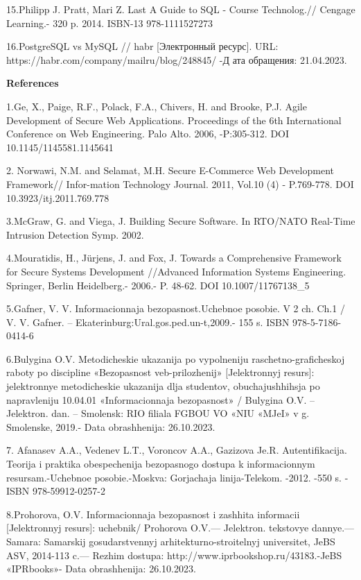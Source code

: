 15.Philipp J. Pratt, Mari Z. Last A Guide to SQL - Course Technolog.//
Cengage Learning.- 320 p. 2014. ISBN-13 978-1111527273

16.PostgreSQL vs MySQL // habr {[}Электронный ресурс{]}. URL:
https://habr.com/company/mailru/blog/248845/ -Д ата обращения:
21.04.2023.

{\bfseries References}

1.Ge, X., Paige, R.F., Polack, F.A., Chivers, H. and Brooke, P.J. Agile
Development of Secure Web Applications. Proceedings of the 6th
International Conference on Web Engineering. Palo Alto. 2006,
-P:305-312. DOI 10.1145/1145581.1145641

2. Norwawi, N.M. and Selamat, M.H. Secure E-Commerce Web Development
Framework// Infor-mation Technology Journal. 2011, Vol.10 (4) -
P.769-778. DOI 10.3923/itj.2011.769.778

3.McGraw, G. and Viega, J. Building Secure Software. In RTO/NATO
Real-Time Intrusion Detection Symp. 2002.

4.Mouratidis, H., Jürjens, J. and Fox, J. Towards a Comprehensive
Framework for Secure Systems Development //Advanced Information Systems
Engineering. Springer, Berlin Heidelberg.- 2006.- P. 48-62. DOI
10.1007/11767138\_5

5.Gafner, V. V. Informacionnaja bezopasnost\textquotesingle.Uchebnoe
posobie. V 2 ch. Ch.1 / V. V. Gafner. --
Ekaterinburg:Ural.gos.ped.un-t,2009.- 155 s. ISBN 978-5-7186-0414-6

6.Bulygina O.V. Metodicheskie ukazanija po vypolneniju
raschetno-graficheskoj raboty po discipline
«Bezopasnost\textquotesingle{} veb-prilozhenij» {[}Jelektronnyj
resurs{]}: jelektronnye metodicheskie ukazanija dlja studentov,
obuchajushhihsja po napravleniju 10.04.01 «Informacionnaja
bezopasnost\textquotesingle» / Bulygina O.V. -- Jelektron. dan. --
Smolensk: RIO filiala FGBOU VO «NIU «MJeI» v g. Smolenske, 2019.- Data
obrashhenija: 26.10.2023.

7. Afanas\textquotesingle ev A.A., Veden\textquotesingle ev L.T.,
Voroncov A.A., Gazizova Je.R. Autentifikacija. Teorija i praktika
obespechenija bezopasnogo dostupa k informacionnym resursam.-Uchebnoe
posobie.-Moskva: Gorjachaja linija-Telekom. -2012. -550 s. - ISBN
978-59912-0257-2

8.Prohorova, O.V. Informacionnaja bezopasnost\textquotesingle{} i
zashhita informacii {[}Jelektronnyj resurs{]}: uchebnik/ Prohorova
O.V.--- Jelektron. tekstovye dannye.--- Samara: Samarskij
gosudarstvennyj arhitekturno-stroitel\textquotesingle nyj universitet,
JeBS ASV, 2014-113 c.--- Rezhim dostupa:
http://www.iprbookshop.ru/43183.-JeBS «IPRbooks»- Data obrashhenija:
26.10.2023.


